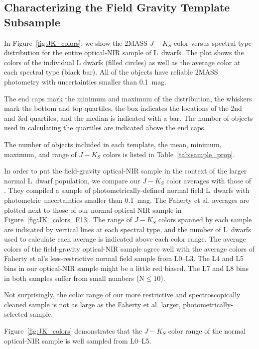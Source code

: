 \documentclass[12pt,preprint]{aastex}
\begin{document}
\subsection{Characterizing the Field Gravity Template Subsample}
\label{sec:templates_normal}

In Figure~\ref{fig:JK_colors}, we show the 2MASS $J-K_S$ color versus spectral type distribution for the entire optical-NIR sample of L~dwarfs. The plot shows the colors of the individual L dwarfs (filled circles) as well as the average color at each spectral type (black bar). All of the objects have reliable 2MASS photometry with uncertainties smaller than 0.1~mag. 

The end caps mark the minimum and maximum of the distribution, the whiskers mark the bottom and top quartiles, the box indicates the locations of the 2nd and 3rd quartiles, and the median is indicated with a bar. The number of objects used in calculating the quartiles are indicated above the end caps.

The number of objects included in each template, the mean, minimum, maximum, and range of $J-K_S$ colors is listed in Table~\ref{tab:sample_prop}. 

In order to put the field-gravity optical-NIR sample in the context of the larger normal L~dwarf population, we compare our $J-K_S$ color averages with those of \citet{Faherty13_0355}. 
They compiled a sample of photometrically-defined normal field L~dwarfs with photometric uncertainties smaller than 0.1~mag. 
The Faherty et al. averages are plotted next to those of our normal optical-NIR sample in Figure~\ref{fig:JK_colors_F13}. 
The range of $J-K_S$ colors spanned by each sample are indicated by vertical lines at each spectral type, and the number of L~dwarfs used to calculate each average is indicated above each color range. 
The average colors of the field-gravity optical-NIR sample agree well with the average colors of Faherty et al's less-restrictive normal field sample from L0--L3.
The L4 and L5 bins in our optical-NIR sample might be a little red biased.
The L7 and L8 bins in both samples suffer from small numbers (N$\le10$). 

Not surprisingly, the color range of our more restrictive and spectroscopically cleaned sample is not as large as the Faherty et al. larger, photometrically-selected sample. 

Figure~\ref{fig:JK_colors} demonstrates that the $J-K_S$ color range of the normal optical-NIR sample is well sampled from L0--L5. 
\end{document}
